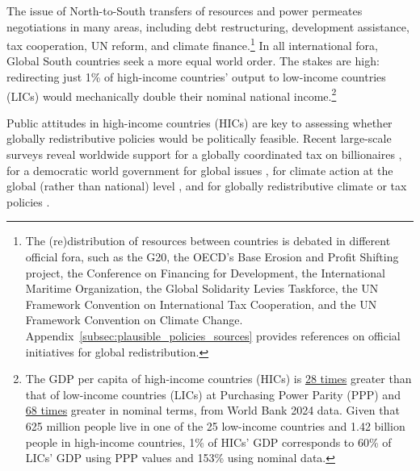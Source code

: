 \documentclass[12pt,english]{article}
\begin{document}
The issue of North-to-South transfers of resources and power 
permeates negotiations in many areas, including debt restructuring, development assistance, tax cooperation, UN reform, and climate finance.\footnote{The (re)distribution of resources between countries is debated in different official fora, such as the G20, the OECD's Base Erosion and Profit Shifting project, the Conference on Financing for Development, the International Maritime Organization, the Global Solidarity Levies Taskforce, the UN Framework Convention on International Tax Cooperation, and the UN Framework Convention on Climate Change. Appendix~\ref{subsec:plausible_policies_sources} provides references on official initiatives for global redistribution.} 
In all international fora, Global South countries seek %
a more equal world order. The stakes are high: redirecting just 1\% of high-income countries' output to low-income countries (LICs) would mechanically double their nominal national income.\footnote{The GDP per capita of high-income countries (HICs) is \href{https://data.worldbank.org/indicator/NY.GDP.PCAP.PP.CD?contextual=default&end=2024&locations=EU-ZG-XD-XM-1W-IN-US-CD-BI-LU-CN&start=2024&view=bar}{28 times} greater than that of low-income countries (LICs) at Purchasing Power Parity (PPP) and \href{https://data.worldbank.org/indicator/NY.GDP.PCAP.CD?end=2024&locations=EU-ZG-XD-XM-1W-IN-US-CD-BI-LU-CN&start=2024&view=bar}{68 times} greater in nominal terms, from World Bank 2024 data. Given that 625 million people live in one of the 25 low-income countries %
and 1.42 billion people in high-income countries, %
1\% of HICs' GDP corresponds to 60\% of LICs' GDP using PPP values and 153\% using nominal data.
} %

Public attitudes in high-income countries (HICs) are key to assessing whether globally redistributive policies would be politically feasible. 
Recent large-scale surveys reveal worldwide 
support for a globally coordinated tax on billionaires \citep{cappelen_majority_2025}, %
for a democratic world government for global issues \citep{ghassim_who_2024}, for climate action at the global (rather than national) level \citep{dechezlepretre_fighting_2025}, %
and for globally redistributive climate or tax policies \citep{fabre_majority_2025}. 
\end{document}
